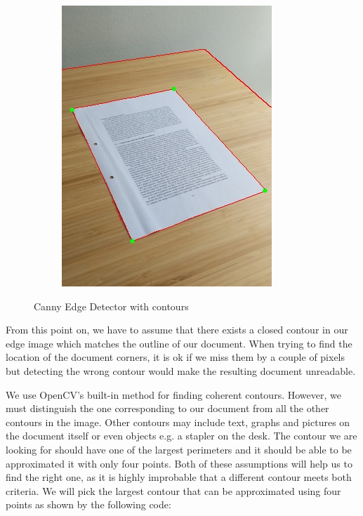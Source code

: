 \documentclass[bibliography=totoc]{scrartcl}
\begin{document}
\begin{figure}[ht!]
\begin{subfigure}[b]{0.3\linewidth}
		\includegraphics[width=\linewidth]{imgs/contours/extreme_angle.jpg}
	\end{subfigure}
	\caption{Canny Edge Detector with contours}
	\label{fig:contours}
\end{figure}

From this point on, we have to assume that there exists a closed contour in our edge image which matches the outline of our document.
When trying to find the location of the document corners, it is ok if we miss them by a couple of pixels but detecting the wrong contour would make the resulting document unreadable.

We use OpenCV's built-in method for finding coherent contours.
However, we must distinguish the one corresponding to our document from all the other contours in the image.
Other contours may include text, graphs and pictures on the document itself or even objects e.g. a stapler on the desk.
The contour we are looking for should have one of the largest perimeters and it should be able to be approximated it with only four points.
Both of these assumptions will help us to find the right one, as it is highly improbable that a different contour meets both criteria.
We will pick the largest contour that can be approximated using four points as shown by the following code: \\
\end{document}
